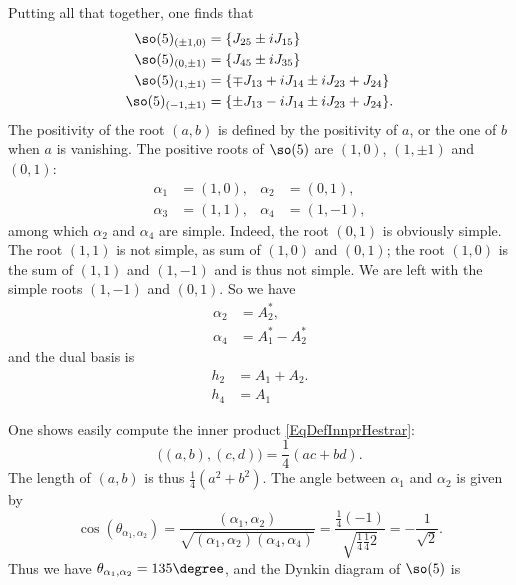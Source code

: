 Putting all that together, one finds that
\begin{subequations}		\label{EqRootSOImpaircinq}
	\begin{align}
		\so(5)_{(\pm 1,0)}	&=\{ J_{25}\pm iJ_{15} \}\\
		\so(5)_{(0,\pm 1)}	&=\{ J_{45}\pm iJ_{35} \}\\
		\so(5)_{(1,\pm 1)}	&=\{ \mp J_{13}+iJ_{14}\pm iJ_{23}+J_{24} \}\\
		\so(5)_{(-1,\pm 1)}	&=\{ \pm J_{13}-iJ_{14}\pm iJ_{23}+J_{24} \}.
	\end{align}
\end{subequations}
The positivity of the root $(a,b)$ is defined by the positivity of $a$, or the one of $b$ when $a$ is vanishing. The positive roots of $\so(5)$ are $(1,0)$, $(1,\pm 1)$ and $(0,1)$:
\begin{equation}
	\begin{aligned}
		\alpha_1&=(1,0),	&\alpha_2&=(0,1),\\
		\alpha_3&=(1,1),	&\alpha_4&=(1,-1),
	\end{aligned}
\end{equation}
among which $\alpha_2$ and $\alpha_4$ are simple. Indeed, the root $(0,1)$ is obviously simple. The root $(1,1)$ is not simple, as sum of $(1,0)$ and $(0,1)$; the root $(1,0)$ is the sum of $(1,1)$ and $(1,-1)$ and is thus not simple. We are left with the simple roots $(1,-1)$ and $(0,1)$. So we have
\begin{subequations}
	\begin{align}
		\alpha_2	&=A_2^*,\\
		\alpha_4	&=A_1^*-A_2^*
	\end{align}
\end{subequations}
and the dual basis is
\begin{subequations}
	\begin{align}
		h_2	&=A_1+A_2.\\
		h_4	&=A_1
	\end{align}
\end{subequations}

One shows easily compute the inner product \eqref{EqDefInnprHestrar}:
\begin{equation}		\label{EqPridScalacbdroot}
	\big( (a,b),(c,d) \big)	= \frac{1}{ 4 }(ac+bd).
\end{equation}
The length of $(a,b)$ is thus $\frac{1}{ 4 }(a^2+b^2)$. The angle between $\alpha_1$ and $\alpha_2$ is given by
\begin{equation}
	\cos(\theta_{\alpha_1,\alpha_2})=\frac{ (\alpha_1,\alpha_2) }{ \sqrt{(\alpha_1,\alpha_2)(\alpha_4,\alpha_4)} }=\frac{ \frac{1}{ 4 }(-1) }{ \sqrt{ \frac{1}{ 4 }\frac{1}{ 4 }2  } }=-\frac{1}{  \sqrt{2} }.
\end{equation}
Thus we have $\theta_{\alpha_1,\alpha_2}=135\degree$, and the Dynkin diagram of $\so(5)$ is
\begin{center}
   
\end{center}

